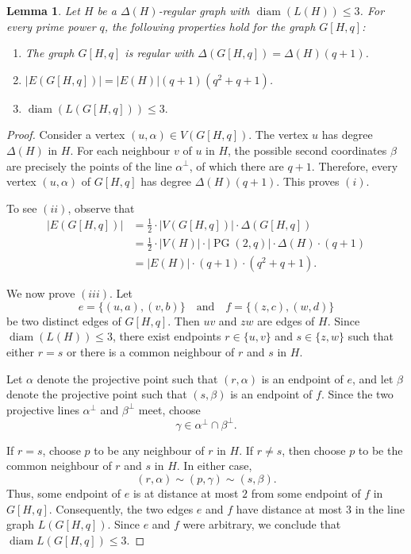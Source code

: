 \documentclass[11pt]{article}
\theoremstyle{plain}
\newtheorem{lemma}[theorem]{Lemma}
\numberwithin{equation}{section}
\DeclareMathOperator{\diam}{diam}
\DeclareMathOperator{\PG}{PG}
\begin{document}
\begin{lemma}\label{lemma:G[H,q]} Let $H$ be a $\Delta(H)$-regular graph with $\diam(L(H))\le 3$. For every prime power $q$, the following properties hold for the graph $G[H,q]$:
\begin{enumerate}[$(i)$]
    \item The graph $G[H,q]$ is regular with $\Delta(G[H,q]) =\Delta(H) (q+1)$.
    \item $|E(G[H,q])|=|E(H)|(q+1)(q^2+q+1)$.
    \item $\diam(L(G[H,q]))\le 3.$
\end{enumerate}
\end{lemma}

\begin{proof}
Consider a vertex $(u,\alpha)\in V(G[H,q])$. The vertex $u$ has degree $\Delta(H)$ in $H$. For each neighbour $v$ of $u$ in $H$, the possible second coordinates $\beta$ are precisely the points of the line $\alpha^\perp$, of which there are $q+1$. Therefore, every vertex $(u,\alpha)$ of $G[H,q]$ has degree $\Delta(H)(q+1).$ This proves $(i)$.

To see $(ii)$, observe that 
\begin{align*}
|E(G[H,q])| &= \frac{1}{2}\cdot |V(G[H,q])|\cdot \Delta(G[H,q]) \\
& = \frac{1}{2} \cdot |V(H)|\cdot |\PG(2,q)| \cdot  \Delta(H) \cdot (q+1)\\
& = |E(H)| \cdot (q+1)\cdot (q^2 + q + 1).  
\end{align*}

We now prove $(iii)$. Let
\[
        e=\{(u,a),(v,b)\}
        \quad \text{and}\quad 
        f=\{(z,c),(w,d)\}
\]
be two distinct edges of $G[H,q]$. Then $uv$ and $zw$ are edges of $H$. Since $\diam(L(H))\le 3$, there exist endpoints $r\in\{u,v\}$ and
$s\in\{z,w\}$ such that either $r=s$ or there is a common neighbour of $r$ and $s$ in $H$. 
 
Let $\alpha$ denote the projective point such that $(r,\alpha)$ is an endpoint of $e$, and let $\beta$ denote the projective point such that $(s, \beta)$ is an endpoint of $f$. Since the two projective lines $\alpha^\perp$ and $\beta^\perp$
meet, choose
\[
        \gamma\in \alpha^\perp\cap \beta^\perp.
\]

If $r=s$, choose $p$ to be any neighbour of $r$ in $H$. If $r\neq s$, then choose $p$ to be the common neighbour of $r$ and $s$ in $H$. In either case, 
\[
        (r,\alpha)\sim (p,\gamma)\sim (s,\beta).
\]
Thus, some endpoint of $e$ is at distance at most $2$ from some endpoint of $f$ in $G[H,q]$. Consequently, the two edges $e$ and $f$ have distance at most $3$ in
the line graph $L(G[H,q])$. Since $e$ and $f$ were arbitrary, we conclude that $\diam L(G[H,q])\le 3$.
\end{proof}
\end{document}
